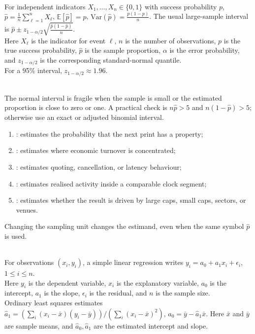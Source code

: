 \begin{model} \\
For independent indicators $X_1,\ldots,X_n\in\{0,1\}$ with success probability $p$,\\
$\hat{p}=\frac{1}{n}\sum\limits_{\ell=1}^{n}X_\ell$, $\mathbb{E}[\hat{p}]=p$, $\mathrm{Var}(\hat{p})=\frac{p(1-p)}{n}$. The usual large-sample interval is $\hat{p}\pm z_{1-\alpha/2}\sqrt{\frac{\hat{p}(1-\hat{p})}{n}}$.\\
Here $X_\ell$ is the indicator for event $\ell$, $n$ is the number of observations, $p$ is the true success probability, $\hat{p}$ is the sample proportion, $\alpha$ is the error probability, and $z_{1-\alpha/2}$ is the corresponding standard-normal quantile.\\
For a 95\% interval, $z_{1-\alpha/2}\approx1.96$.
\end{model}

\begin{caveat} \\
The normal interval is fragile when the sample is small or the estimated proportion is close to zero or one. A practical check is $n\hat{p}>5$ and $n(1-\hat{p})>5$; otherwise use an exact or adjusted binomial interval.
\end{caveat}

\begin{taxonomy} 
\begin{enumerate}[label=\roman*.]
\setlength{\itemsep}{0pt}
\item {}: estimates the probability that the next print has a property;
\item {}: estimates where economic turnover is concentrated;
\item {}: estimates quoting, cancellation, or latency behaviour;
\item {}: estimates realised activity inside a comparable clock segment;
\item {}: estimates whether the result is driven by large caps, small caps, sectors, or venues.
\end{enumerate}
Changing the sampling unit changes the estimand, even when the same symbol $\hat{p}$ is used.
\end{taxonomy}

\begin{model} \\
For observations $(x_i,y_i)$, a simple linear regression writes $y_i=a_0+a_1x_i+\epsilon_i$, $1\leq i\leq n$.\\
Here $y_i$ is the dependent variable, $x_i$ is the explanatory variable, $a_0$ is the intercept, $a_1$ is the slope, $\epsilon_i$ is the residual, and $n$ is the sample size.\\
Ordinary least squares estimates $\hat{a}_1= \left( \sum\limits_i(x_i-\bar{x})(y_i-\bar{y}) \right) / \left( \sum\limits_i(x_i-\bar{x})^2 \right)$, $\hat{a}_0=\bar{y}-\hat{a}_1\bar{x}$. Here $\bar{x}$ and $\bar{y}$ are sample means, and $\hat{a}_0,\hat{a}_1$ are the estimated intercept and slope.
\end{model}

